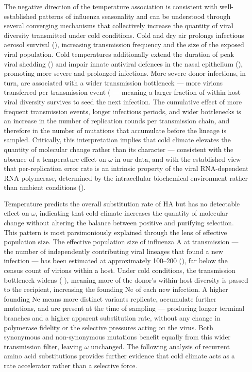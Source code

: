 \documentclass{pnas-new}
\begin{document}
The negative direction of the temperature association is consistent with well-established patterns of influenza seasonality and can be understood through several converging mechanisms that collectively increase the quantity of viral diversity transmitted under cold conditions. Cold and dry air prolongs infectious aerosol survival (\cite{lowen_influenza_2007, shaman_absolute_2009}), increasing transmission frequency and the size of the exposed viral population. Cold temperatures additionally extend the duration of peak viral shedding (\cite{lowen_influenza_2007}) and impair innate antiviral defences in the nasal epithelium (\cite{huang_cold_2023, kudo_low_2019}), promoting more severe and prolonged infections. More severe donor infections, in turn, are associated with a wider transmission bottleneck — more virions transferred per transmission event (\cite{sobel_leonard_transmission_2017, frise_contact_2016} — meaning a larger fraction of within-host viral diversity survives to seed the next infection. The cumulative effect of more frequent transmission events, longer infectious periods, and wider bottlenecks is an increase in the number of replication rounds per transmission chain, and therefore in the number of mutations that accumulate before the lineage is sampled. Critically, this interpretation implies that cold climate elevates the quantity of molecular change rather than its character — consistent with the absence of a temperature effect on $\omega$ in our data, and with the established view that per-replication error rate is an intrinsic property of the viral RNA-dependent RNA polymerase, determined by the intracellular biochemical environment rather than ambient conditions (\cite{partlow_influenza_2025}).

Temperature predicts the overall substitution rate of HA but has no detectable effect on $\omega$, indicating that cold climate increases the quantity of molecular change without altering the balance between positive and purifying selection. This pattern is most parsimoniously explained through the lens of effective population size. The effective population size of influenza A at transmission — the number of independently contributing viral lineages that found a new infection — has been estimated at approximately 100–200 (\cite{poon_quantifying_2016}), far below the census count of virions within a host. Under cold conditions, the transmission bottleneck widens (\cite{sobel_leonard_transmission_2017, frise_contact_2016} ), meaning more of the donor's within-host diversity is passed to the recipient, increasing the founding Ne of each new infection. A higher founding Ne means more distinct variants replicate, accumulate further mutations, and are present at the time of sampling — producing longer terminal branches and a higher apparent substitution rate, without any change in polymerase fidelity or the selective pressures acting on the virus. Both synonymous and non-synonymous mutations benefit equally from this wider transmission filter, leaving $\omega$ unchanged. The following analysis of recurrent amino acid substitutions provides further evidence that cold climate acts as a rate accelerator rather than a selective force.
\end{document}
